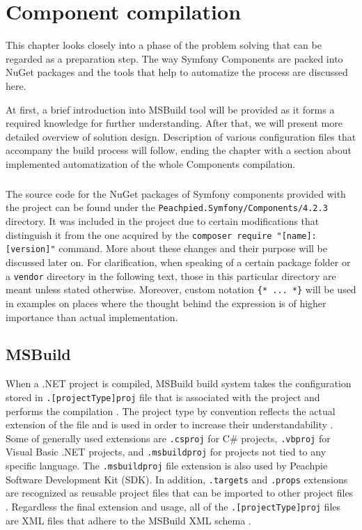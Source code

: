 \chapter{Component compilation}
This chapter looks closely into a phase of the problem solving that can be regarded as a preparation step. The way Symfony Components are packed into NuGet packages and the tools that help to automatize the process are discussed here. 

At first, a brief introduction into MSBuild tool will be provided as it forms a required knowledge for further understanding. After that, we will present more detailed overview of solution design. Description of various configuration files that accompany the build process will follow, ending the chapter with a section about implemented automatization of the whole Components compilation.

\paragraph{} The source code for the NuGet packages of Symfony components provided with the project can be found under the \texttt{Peachpied.Symfony/Components/4.2.3} directory. It was included in the project due to certain modifications that distinguish it from the one acquired by the \texttt{composer require "[name]:[version]"} command. More about these changes and their purpose will be discussed later on. For clarification, when speaking of a certain package folder or a \texttt{vendor} directory in the following text, those in this particular directory are meant unless stated otherwise. Moreover, custom notation \texttt{\{* ... *\}} will be used in examples on places where the thought behind the expression is of higher importance than actual implementation.


\section{MSBuild}
When a .NET project is compiled, MSBuild build system takes the configuration stored in \texttt{.[projectType]proj} file that is associated with the project and performs the compilation \citep{microsoft.docs}. The project type by convention reflects the actual extension of the file and is used in order to increase their understandability \citep{microsoft.docs}. Some of generally used extensions are \texttt{.csproj} for C\# projects, \texttt{.vbproj} for Visual Basic .NET projects, and \texttt{.msbuildproj} for projects not tied to any specific language. The \texttt{.msbuildproj} file extension is also used by Peachpie Software Development Kit (SDK). In addition, \texttt{.targets} and \texttt{.props} extensions are recognized as reusable project files that can be imported to other project files \citep{microsoft.docs}. Regardless the final extension and usage, all of the \texttt{.[projectType]proj} files are XML files that adhere to the MSBuild XML schema \citep{microsoft.docs}.

